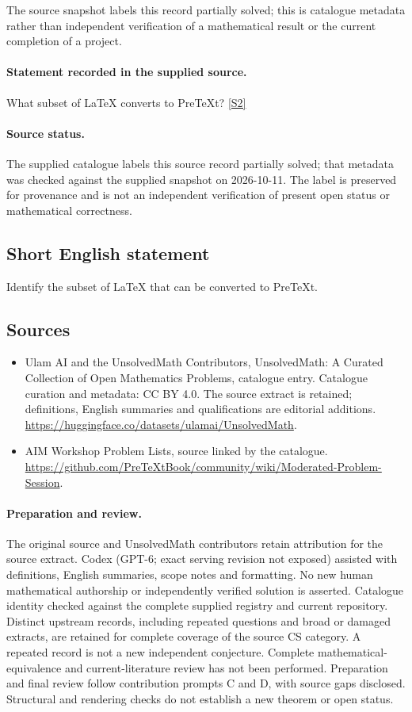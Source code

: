 \documentclass[11pt]{article}
\begin{document}
The source snapshot labels this record partially solved; this is catalogue metadata rather than independent verification of a mathematical result or the current completion of a project.
\paragraph{Statement recorded in the supplied source.}
What subset of LaTeX converts to PreTeXt? \href{https://github.com/PreTeXtBook/community/wiki/Moderated-Problem-Session}{[S2]}
\paragraph{Source status.}
The supplied catalogue labels this source record partially solved; that metadata was checked against the supplied snapshot on 2026-10-11. The label is preserved for provenance and is not an independent verification of present open status or mathematical correctness.
\subsection{Short English statement}
Identify the subset of LaTeX that can be converted to PreTeXt.
\subsection{Sources}
\begin{itemize}
\item[S1] Ulam AI and the UnsolvedMath Contributors, UnsolvedMath: A Curated Collection of Open Mathematics Problems, catalogue entry. Catalogue curation and metadata: CC BY 4.0. The source extract is retained; definitions, English summaries and qualifications are editorial additions.
\url{https://huggingface.co/datasets/ulamai/UnsolvedMath}.
\item[S2] AIM Workshop Problem Lists, source linked by the catalogue.
\url{https://github.com/PreTeXtBook/community/wiki/Moderated-Problem-Session}.
\end{itemize}
\paragraph{Preparation and review.}
The original source and UnsolvedMath contributors retain attribution for the source extract. Codex (GPT-6; exact serving revision not exposed) assisted with definitions, English summaries, scope notes and formatting. No new human mathematical authorship or independently verified solution is asserted. Catalogue identity checked against the complete supplied registry and current repository. Distinct upstream records, including repeated questions and broad or damaged extracts, are retained for complete coverage of the source CS category. A repeated record is not a new independent conjecture. Complete mathematical-equivalence and current-literature review has not been performed. Preparation and final review follow contribution prompts C and D, with source gaps disclosed. Structural and rendering checks do not establish a new theorem or open status.
\label{end:statement}
\end{document}
